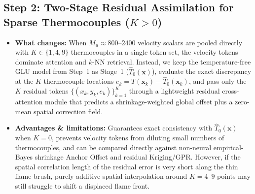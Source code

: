 \documentclass[11pt,letterpaper]{article}
\begin{document}
\subsection*{Step 2: Two-Stage Residual Assimilation for Sparse Thermocouples ($K > 0$)}
\begin{itemize}
    \item \textbf{What changes:} When $M_u \approx 800\text{--}2400$ velocity scalars are pooled directly with $K \in \{1, 4, 9\}$ thermocouples in a single token set, the velocity tokens dominate attention and $k$-NN retrieval. Instead, we keep the temperature-free GLU model from Step~1 as Stage~1 ($\hat{T}_0(\mathbf{x})$), evaluate the exact discrepancy at the $K$ thermocouple locations $e_k = T(\mathbf{x}_k) - \hat{T}_0(\mathbf{x}_k)$, and pass only the $K$ residual tokens $\{(x_k, y_k, e_k)\}_{k=1}^K$ through a lightweight residual cross-attention module that predicts a shrinkage-weighted global offset plus a zero-mean spatial correction field.
    \item \textbf{Advantages \& limitations:} Guarantees exact consistency with $\hat{T}_0(\mathbf{x})$ when $K=0$, prevents velocity tokens from diluting small numbers of thermocouples, and can be compared directly against non-neural empirical-Bayes shrinkage Anchor Offset and residual Kriging/GPR. However, if the spatial correlation length of the residual error is very short along the thin flame brush, purely additive spatial interpolation around $K=4\text{--}9$ points may still struggle to shift a displaced flame front.
\end{itemize}
\end{document}
